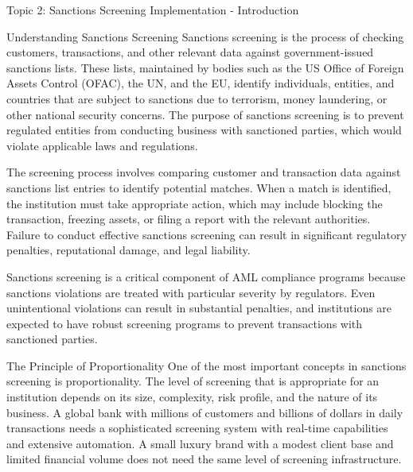 \documentclass[8pt]{beamer}  %
\begin{document}
	\begin{frame}{Topic 2: Sanctions Screening Implementation - Introduction}
		\begin{block}{\large Understanding Sanctions Screening}
			Sanctions screening is the process of checking customers, transactions, and other relevant data against government-issued sanctions lists. These lists, maintained by bodies such as the US Office of Foreign Assets Control (OFAC), the UN, and the EU, identify individuals, entities, and countries that are subject to sanctions due to terrorism, money laundering, or other national security concerns. The purpose of sanctions screening is to prevent regulated entities from conducting business with sanctioned parties, which would violate applicable laws and regulations.
			
			The screening process involves comparing customer and transaction data against sanctions list entries to identify potential matches. When a match is identified, the institution must take appropriate action, which may include blocking the transaction, freezing assets, or filing a report with the relevant authorities. Failure to conduct effective sanctions screening can result in significant regulatory penalties, reputational damage, and legal liability.
			
			Sanctions screening is a critical component of AML compliance programs because sanctions violations are treated with particular severity by regulators. Even unintentional violations can result in substantial penalties, and institutions are expected to have robust screening programs to prevent transactions with sanctioned parties.
		\end{block}
		
		\vspace{0.2cm}
		\begin{block}{\large The Principle of Proportionality}
			One of the most important concepts in sanctions screening is proportionality. The level of screening that is appropriate for an institution depends on its size, complexity, risk profile, and the nature of its business. A global bank with millions of customers and billions of dollars in daily transactions needs a sophisticated screening system with real-time capabilities and extensive automation. A small luxury brand with a modest client base and limited financial volume does not need the same level of screening infrastructure.
			

\end{block}
\end{frame}
\end{document}
